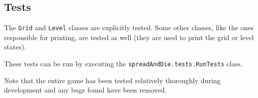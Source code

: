 \documentclass[a4paper]{article}
\begin{document}
	\subsection{Tests}
	
	The \verb|Grid| and \verb|Level| classes are explicitly tested. Some other classes, like the ones responsible for printing, are tested as well (they are used to print the grid or level states).
	
	These tests can be run by executing the \verb|spreadAndDie.tests.RunTests| class.
	
	Note that the entire game has been tested relatively thoroughly during development and any bugs found have been removed.
\end{document}
